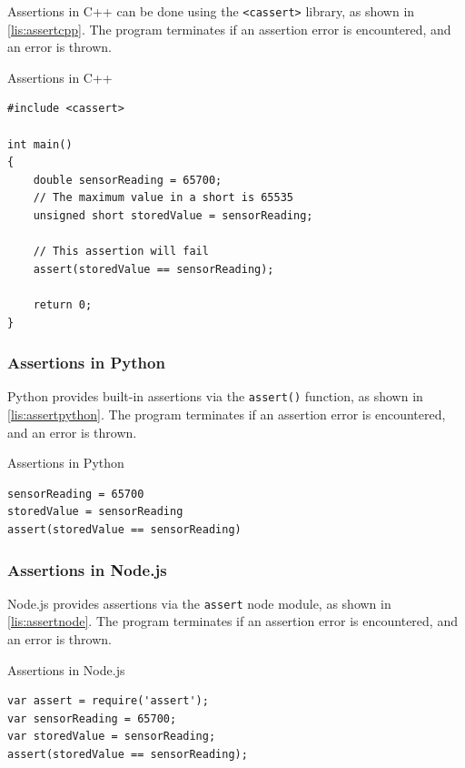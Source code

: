 Assertions in C++ can be done using the \texttt{<cassert>} library, as shown in \autoref{lis:assertcpp}. The program terminates if an assertion error is encountered, and an error is thrown.

\begin{listing}
\caption{Assertions in C++}
\label{lis:assertcpp}
	\begin{verbatim}
#include <cassert>

int main()
{
	double sensorReading = 65700;
	// The maximum value in a short is 65535
	unsigned short storedValue = sensorReading;

	// This assertion will fail
	assert(storedValue == sensorReading);

	return 0;
}
	\end{verbatim}
\end{listing}


\subsubsection{Assertions in Python} %
\label{ssub:assertions_in_python}

Python provides built-in assertions via the \texttt{assert()} function, as shown in \autoref{lis:assertpython}. The program terminates if an assertion error is encountered, and an error is thrown.

\begin{listing}
\caption{Assertions in Python}
\label{lis:assertpython}
	\begin{verbatim}
sensorReading = 65700
storedValue = sensorReading
assert(storedValue == sensorReading)
	\end{verbatim}
\end{listing}


\subsubsection{Assertions in Node.js} %
\label{ssub:assertions_in_javascript}

Node.js provides assertions via the \texttt{assert} node module, as shown in \autoref{lis:assertnode}. The program terminates if an assertion error is encountered, and an error is thrown.

\begin{listing}
\caption{Assertions in Node.js}
\label{lis:assertnode}
	\begin{verbatim}
var assert = require('assert');
var sensorReading = 65700;
var storedValue = sensorReading;
assert(storedValue == sensorReading);
	\end{verbatim}
\end{listing}

